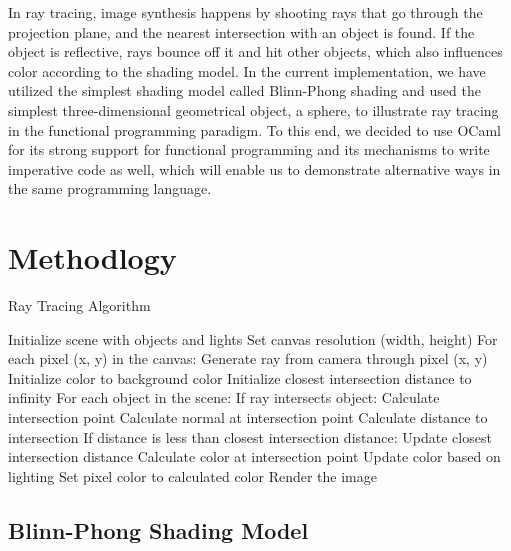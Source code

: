 \documentclass[conference]{IEEEtran}
\begin{document}
In ray tracing, image synthesis happens by shooting rays that go through the projection plane, and the nearest intersection with an object is found. If the object is reflective, rays bounce off it and hit other objects, which also influences color according to the shading model. In the current implementation, we have utilized the simplest shading model called Blinn-Phong shading and used the simplest three-dimensional geometrical object, a sphere, to illustrate ray tracing in the functional programming paradigm. To this end, we decided to use OCaml for its strong support for functional programming and its mechanisms to write imperative code as well, which will enable us to demonstrate alternative ways in the same programming language.
\section{Methodlogy}

\begin{algorithm}
    \caption{Ray Tracing Algorithm}
    \begin{algorithmic}[1]
        \STATE Initialize scene with objects and lights
        \STATE Set canvas resolution (width, height)
        \STATE For each pixel (x, y) in the canvas:
            \STATE \quad Generate ray from camera through pixel (x, y)
            \STATE \quad Initialize color to background color
            \STATE \quad Initialize closest intersection distance to infinity
            \STATE \quad For each object in the scene:
                \STATE \quad \quad If ray intersects object:
                    \STATE \quad \quad \quad Calculate intersection point
                    \STATE \quad \quad \quad Calculate normal at intersection point
                    \STATE \quad \quad \quad Calculate distance to intersection
                    \STATE \quad \quad \quad If distance is less than closest intersection distance:
                        \STATE \quad \quad \quad \quad Update closest intersection distance
                        \STATE \quad \quad \quad \quad Calculate color at intersection point
                        \STATE \quad \quad \quad \quad Update color based on lighting
            \STATE \quad Set pixel color to calculated color
        \STATE Render the image
    \end{algorithmic}
\end{algorithm}
 
\subsection{Blinn-Phong Shading Model}
\end{document}
